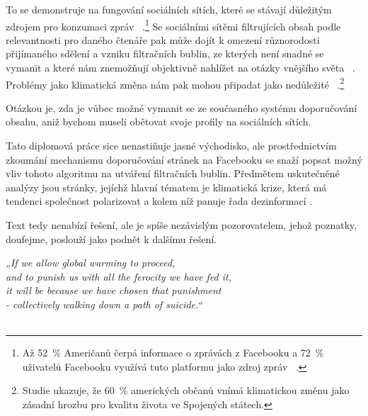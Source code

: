     To se demonstruje na fungování sociálních sítích, které se stávají důležitým zdrojem pro konzumaci zpráv ~\citep{olmstead2011navigating}.\footnote{Až 52~\% Američanů čerpá informace o zprávách z Facebooku a 72~\% uživatelů Facebooku využívá tuto platformu jako zdroj zpráv ~\citep{shearer2019americans}.} Se sociálními sítěmi filtrujících obsah podle relevantnosti pro daného čtenáře pak může dojít k omezení různorodosti přijímaného sdělení a vzniku filtračních bublin, ze kterých není snadné se vymanit a které nám znemožňují objektivně nahlížet na otázky vnějšího světa ~\citep{Claypool1999CombiningCA, Pariser2011, Foth}. Problémy jako klimatická změna nám pak mohou připadat jako nedůležité ~\citep{kennedy2019us}.\footnote{Studie ukazuje, že 60~\% amerických občanů vnímá klimatickou změnu jako zásadní hrozbu pro kvalitu života ve Spojených státech.}
    
    Otázkou je, zda je vůbec možné vymanit se ze současného systému doporu\-čování obsahu, aniž bychom museli obětovat svoje profily na sociálních sítích. 
    
    Tato diplomová práce sice nenastiňuje jasné východisko, ale prostřednictvím zkoumání mechanismu doporučování stránek na Facebooku se snaží popsat možný vliv tohoto algoritmu na utváření filtračních bublin. Předmětem uskutečněné analýzy jsou stránky, jejíchž hlavní tématem je klimatická krize, která má tendenci společnost polarizovat a kolem níž panuje řada dezinformací \citep{kolmes2011climate, WILLIAMS2015126}. 
    
    Text tedy nenabízí řešení, ale je spíše nezávislým pozorovatelem, jehož poznatky, doufejme, poslouží jako podnět k dalšímu řešení. 
    
    \begin{flushright}
    \textit{„If we allow global warming to proceed, \\
    and to punish us with all the ferocity we have fed it, \\
    it will be because we have chosen that punishment\\
    - collectively walking down a path of suicide.“}\\ \citep{wallace2019uninhabitable} \\
    \end{flushright}



